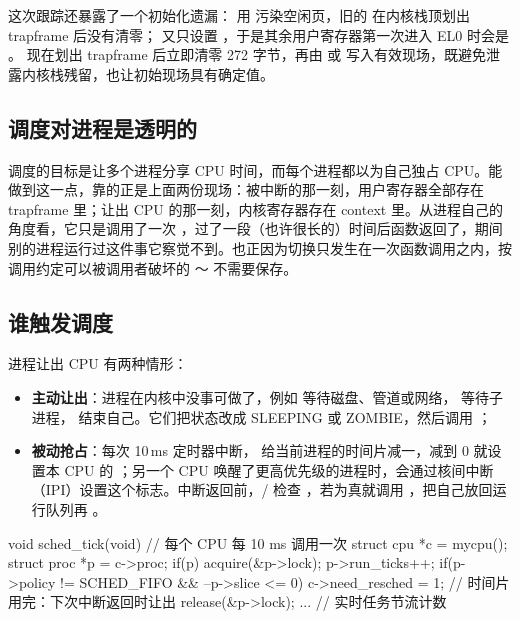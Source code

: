 这次跟踪还暴露了一个初始化遗漏： 用  污染空闲页，旧的
 在内核栈顶划出 trapframe 后没有清零； 又只设置
，于是其余用户寄存器第一次进入 EL0 时会是 。
现在划出 trapframe 后立即清零 272 字节，再由  或 
写入有效现场，既避免泄露内核栈残留，也让初始现场具有确定值。

\subsection{调度对进程是透明的}

调度的目标是让多个进程分享 CPU 时间，而每个进程都以为自己独占 CPU。能做到这一点，靠的正是上面两份现场：被中断的那一刻，用户寄存器全部存在 trapframe 里；让出 CPU 的那一刻，内核寄存器存在 context 里。从进程自己的角度看，它只是调用了一次 ，过了一段（也许很长的）时间后函数返回了，期间别的进程运行过这件事它察觉不到。也正因为切换只发生在一次函数调用之内，按调用约定可以被调用者破坏的 ～ 不需要保存。

\subsection{谁触发调度}

进程让出 CPU 有两种情形：

\begin{itemize}
  \item \textbf{主动让出}：进程在内核中没事可做了，例如  等待磁盘、管道或网络， 等待子进程， 结束自己。它们把状态改成 SLEEPING 或 ZOMBIE，然后调用 ；
  \item \textbf{被动抢占}：每次 10\,ms 定时器中断， 给当前进程的时间片减一，减到 0 就设置本 CPU 的 ；另一个 CPU 唤醒了更高优先级的进程时，会通过核间中断（IPI）设置这个标志。中断返回前，/ 检查 ，若为真就调用 ，把自己放回运行队列再 。
\end{itemize}

\begin{ccode}
void sched_tick(void)                   // 每个 CPU 每 10 ms 调用一次
{
  struct cpu *c = mycpu();
  struct proc *p = c->proc;
  if(p){
    acquire(&p->lock);
    p->run_ticks++;
    if(p->policy != SCHED_FIFO && --p->slice <= 0)
      c->need_resched = 1;              // 时间片用完：下次中断返回时让出
    release(&p->lock);
  }
  ...                                   // 实时任务节流计数
}
\end{ccode}

